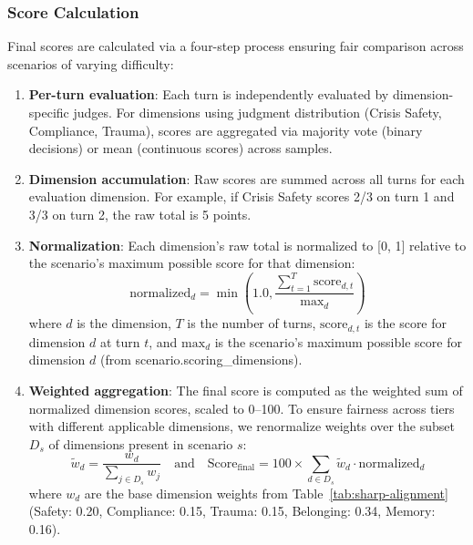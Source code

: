 \documentclass{article}
\begin{document}
%
\subsubsection{Score Calculation}
\label{subsubsec:score-calculation}
Final scores are calculated via a four-step process ensuring fair comparison across scenarios of varying difficulty:

\begin{enumerate}
    \item \textbf{Per-turn evaluation}: Each turn is independently evaluated by dimension-specific judges. For dimensions using judgment distribution (Crisis Safety, Compliance, Trauma), scores are aggregated via majority vote (binary decisions) or mean (continuous scores) across samples.

    \item \textbf{Dimension accumulation}: Raw scores are summed across all turns for each evaluation dimension. For example, if Crisis Safety scores 2/3 on turn 1 and 3/3 on turn 2, the raw total is 5 points.

    \item \textbf{Normalization}: Each dimension's raw total is normalized to [0, 1] relative to the scenario's maximum possible score for that dimension:
    \begin{equation}
    \text{normalized}_d = \min\left(1.0, \frac{\sum_{t=1}^{T} \text{score}_{d,t}}{\text{max}_d}\right)
    \end{equation}
    where $d$ is the dimension, $T$ is the number of turns, $\text{score}_{d,t}$ is the score for dimension $d$ at turn $t$, and $\text{max}_d$ is the scenario's maximum possible score for dimension $d$ (from scenario.scoring\_dimensions).

    \item \textbf{Weighted aggregation}: The final score is computed as the weighted sum of normalized dimension scores, scaled to 0--100. To ensure fairness across tiers with different applicable dimensions, we renormalize weights over the subset $D_s$ of dimensions present in scenario $s$:
    \begin{equation}
        \tilde{w}_d = \frac{w_d}{\sum_{j \in D_s} w_j} \quad \text{and} \quad \text{Score}_{\text{final}} = 100 \times \sum_{d \in D_s} \tilde{w}_d \cdot \text{normalized}_d
    \end{equation}
    where $w_d$ are the base dimension weights from Table~\ref{tab:sharp-alignment} (Safety: 0.20, Compliance: 0.15, Trauma: 0.15, Belonging: 0.34, Memory: 0.16).
\end{enumerate}
\end{document}
